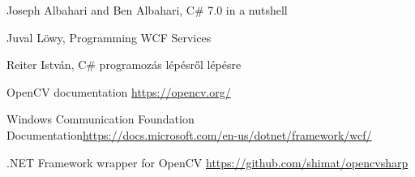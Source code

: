 \begin{thebibliography}{4}

Joseph Albahari and Ben Albahari, C\# 7.0 in a nutshell 

Juval Löwy, Programming WCF Services

 Reiter István, C\# programozás lépésről lépésre 

 OpenCV documentation \url{https://opencv.org/}

 Windows Communication Foundation Documentation\url{https://docs.microsoft.com/en-us/dotnet/framework/wcf/}

 .NET Framework wrapper for OpenCV \url{https://github.com/shimat/opencvsharp}

\end{thebibliography}

